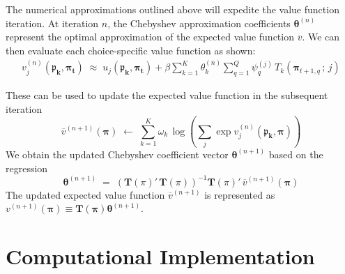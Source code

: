 \documentclass[11pt]{article}
\begin{document}
\noindent The numerical approximations outlined above will expedite the value function iteration. At iteration $n$, the Chebyshev approximation coefficients $\boldsymbol{\theta}^{(n)}$ represent the optimal approximation of the expected value function $\overline{v}$. We can then evaluate each choice-specific value function as shown:
\begin{align*}
	v^{(n)}_j(\mathbf{\boldsymbol{\mathfrak{p}}_k, \boldsymbol{\pi}_t}) \; \approx \; u_j(\mathbf{\boldsymbol{\mathfrak{p}}_k, \boldsymbol{\pi}_t}) + \beta \sum_{k = 1}^K \theta_k^{(n)} \sum_{q = 1}^Q  \psi_{q}^{(j)} \, T_k (\boldsymbol{\pi}_{t+1, q} \, ; \, j)
\end{align*}

\noindent These can be used to update the expected value function in the subsequent iteration
$$
\overline{v}^{(n+1)}(\boldsymbol{\pi}) \; \longleftarrow \; \sum_{k=1}^K \omega_k \, \log \left(\sum_j \exp   v_j^{(n)}(\mathbf{\boldsymbol{\mathfrak{p}}_k, \boldsymbol{\pi}})   \right)
$$
We obtain the updated Chebyshev coefficient vector $\boldsymbol{\theta}^{(n+1)}$ based on the regression
$$
\boldsymbol{\theta}^{(n+1)} \; = \; \left(\boldsymbol{T}(\pi)' \,\boldsymbol{T}(\pi)\right)^{-1} \boldsymbol{T}(\pi)'\, \overline{v}^{(n+1)}(\boldsymbol{\pi})
$$
The updated expected value function $\overline{v}^{(n+1)}$ is represented as $v^{(n+1)}(\boldsymbol{\pi}) \equiv \boldsymbol{T}(\boldsymbol{\pi}) \boldsymbol{\theta}^{(n+1)}$.

\section{Computational Implementation}



\newpage
\printbibliography
\end{document}
